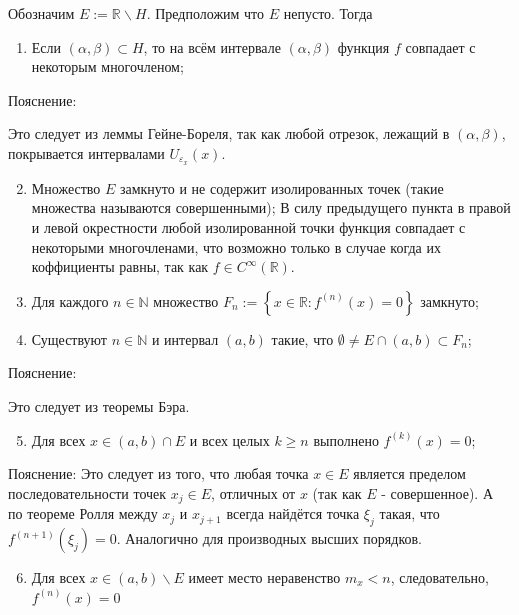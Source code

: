 \documentclass[a4paper,12pt]{article} %
\begin{document}
Обозначим $E:=\mathbb{R} \backslash H$. Предположим что $E$ непусто. Тогда

\begin{enumerate}
  \item Если $(\alpha, \beta) \subset H$, то на всём интервале $(\alpha, \beta)$ функция $f$ совпадает с некоторым многочленом;
\end{enumerate}

Пояснение:

Это следует из леммы Гейне-Бореля, так как любой отрезок, лежащий в $(\alpha, \beta)$, покрывается интервалами $U_{\varepsilon_{x}}(x)$.

\begin{enumerate}
  \setcounter{enumi}{1}
  \item Множество $E$ замкнуто и не содержит изолированных точек (такие множества называются совершенными); В силу предыдущего пункта в правой и левой окрестности любой изолированной точки функция совпадает с некоторыми многочленами, что возможно только в случае когда их коффициенты равны, так как $f \in C^{\infty}(\mathbb{R})$.

  \item Для каждого $n \in \mathbb{N}$ множество $F_{n}:=\left\{x \in \mathbb{R}: f^{(n)}(x)=0\right\}$ замкнуто;

  \item Существуют $n \in \mathbb{N}$ и интервал $(a, b)$ такие, что $\emptyset \neq E \cap(a, b) \subset F_{n}$;

\end{enumerate}

Пояснение:

Это следует из теоремы Бэра.

\begin{enumerate}
  \setcounter{enumi}{4}
  \item Для всех $x \in(a, b) \cap E$ и всех целых $k \geq n$ выполнено $f^{(k)}(x)=0$;
\end{enumerate}

Пояснение:
Это следует из того, что любая точка $x \in E$ является пределом последовательности точек $x_{j} \in E$, отличных от $x$ (так как $E$ - совершенное). А по теореме Ролля между $x_{j}$ и $x_{j+1}$ всегда найдётся точка $\xi_{j}$ такая, что $f^{(n+1)}\left(\xi_{j}\right)=0$. Аналогично для производных высших порядков.

\begin{enumerate}
  \setcounter{enumi}{5}
  \item Для всех $x \in(a, b) \backslash E$ имеет место неравенство $m_{x}<n$, следовательно, $f^{(n)}(x)=0$
\end{enumerate}
\end{document}
